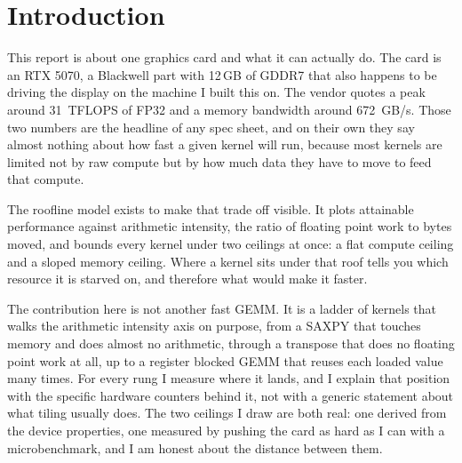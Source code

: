 \section{Introduction}

This report is about one graphics card and what it can actually do. The card is
an RTX 5070, a Blackwell part with 12\,GB of GDDR7 that also happens to be
driving the display on the machine I built this on. The vendor quotes a peak
around \SI{31}{TFLOPS} of FP32 and a memory bandwidth around \SI{672}{GB/s}. Those
two numbers are the headline of any spec sheet, and on their own they say almost
nothing about how fast a given kernel will run, because most kernels are limited
not by raw compute but by how much data they have to move to feed that compute.

The roofline model exists to make that trade off visible. It plots attainable
performance against arithmetic intensity, the ratio of floating point work to
bytes moved, and bounds every kernel under two ceilings at once: a flat compute
ceiling and a sloped memory ceiling. Where a kernel sits under that roof tells
you which resource it is starved on, and therefore what would make it faster.

The contribution here is not another fast GEMM. It is a ladder of kernels that
walks the arithmetic intensity axis on purpose, from a SAXPY that touches memory
and does almost no arithmetic, through a transpose that does no floating point
work at all, up to a register blocked GEMM that reuses each loaded value many
times. For every rung I measure where it lands, and I explain that position with
the specific hardware counters behind it, not with a generic statement about
what tiling usually does. The two ceilings I draw are both real: one derived
from the device properties, one measured by pushing the card as hard as I can
with a microbenchmark, and I am honest about the distance between them.
